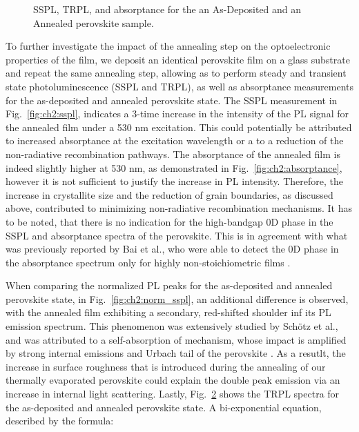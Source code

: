 \begin{figure}[htbp]
\begin{subfigure}[t]{0.4\textwidth}
        \caption{}
        \label{fig:ch2:trpl}
    \end{subfigure}
    \caption{SSPL, TRPL, and absorptance for the an As-Deposited and an Annealed perovskite sample.}
\end{figure}



To further investigate the impact of the annealing step on the optoelectronic properties of the film, we deposit an identical perovskite film on a glass substrate and repeat the same annealing step, allowing as to perform steady and transient state photoluminescence (SSPL and TRPL), as well as absorptance measurements for the as-deposited and annealed perovskite state. The SSPL measurement in Fig.~\ref{fig:ch2:sspl}, indicates a 3-time increase in the intensity of the PL signal for the annealed film under a 530 nm excitation. This could potentially be attributed to increased absorptance at the excitation wavelength or a to a reduction of the non-radiative recombination pathways. The absorptance of the annealed film is indeed slightly higher at 530 nm, as demonstrated in Fig.~\ref{fig:ch2:absorptance}, however it is not sufficient to justify the increase in PL intensity. Therefore, the increase in crystallite size and the reduction of grain boundaries, as discussed above, contributed to minimizing non-radiative recombination mechanisms. It has to be noted, that there is no indication for the high-bandgap 0D  phase in the SSPL and absorptance spectra of the perovskite. This is in agreement with what was previously reported by Bai et al., who were able to detect the 0D phase in the absorptance spectrum only for highly non-stoichiometric films \cite{Bai2019AStability}. 

When comparing the normalized PL peaks for the as-deposited and annealed perovskite state, in Fig.~\ref{fig:ch2:norm_sspl}, an additional difference is observed, with the annealed film exhibiting a secondary, red-shifted shoulder inf its PL emission spectrum. This phenomenon was extensively studied by Schötz et al., and was attributed to a self-absorption of mechanism, whose impact is amplified by strong internal emissions and Urbach tail of the perovskite \cite{Schotz2020DoubleSelf-absorption}. As a resutlt, the increase in surface roughness that is introduced during the annealing of our thermally evaporated perovskite could explain the double peak emission via an increase in internal light scattering. Lastly, Fig.~\ref{fig:ch2:trpl} shows the TRPL spectra for the as-deposited and annealed perovskite state. A bi-exponential equation, described by the formula: 


